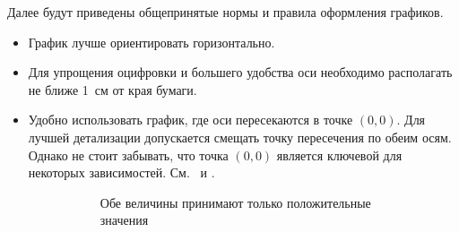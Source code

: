 Далее будут приведены общепринятые нормы и правила оформления графиков.
\begin{itemize}
    \item График лучше ориентировать горизонтально.
    \item Для упрощения оцифровки и большего удобства оси необходимо располагать не ближе 1~см от края бумаги.
    \item Удобно использовать график, где оси пересекаются в точке $(0,0)$. Для лучшей детализации допускается смещать точку пересечения по обеим осям. Однако не стоит забывать, что точка $(0,0)$ является ключевой для некоторых зависимостей. См.~ и .
\begin{figure}[h]
    \hfill
    \begin{subfigure}{0.46\tw}
        \centering
        \caption{Обе величины принимают только положительные значения}
    \end{subfigure}
    \hfill
    \begin{subfigure}{0.46\tw}
        \centering
\end{subfigure}
\end{figure}
\end{itemize}
